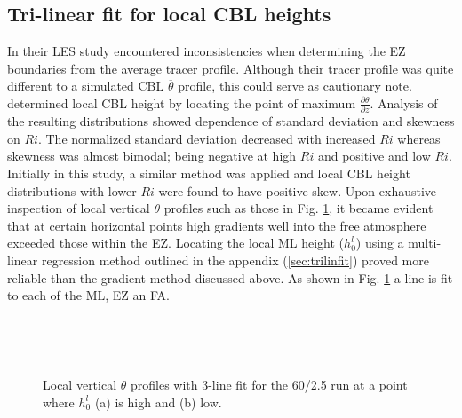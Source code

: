 \subsection{Tri-linear fit for local CBL heights}
In their LES study \cite{BrooksFowler2} encountered inconsistencies when determining the EZ boundaries from the average tracer profile.  Although their tracer profile was quite different to a simulated CBL $\overline{\theta}$ profile, this could serve as cautionary note.  \cite{SullMoengStev} determined local CBL height by locating the point of maximum $\frac{\partial \theta}{\partial z}$.  Analysis of the resulting distributions showed dependence of standard deviation and skewness on $Ri$.  The normalized standard deviation decreased with increased $Ri$ whereas skewness was almost bimodal; being negative at high $Ri$ and positive and low $Ri$.  Initially in this study, a similar method was applied and local CBL height distributions with lower $Ri$ were found to have positive skew.  Upon exhaustive inspection of local vertical $\theta$  profiles such as those in Fig. \ref{fig:rssfitshigh}, it became evident that at certain horizontal points high gradients well into the free atmosphere exceeded those within the EZ.  Locating the local ML height ($h^{l}_{0}$) using a multi-linear regression method outlined in the appendix (\ref{sec:trilinfit}) proved more reliable than the gradient method discussed above.  As shown in Fig. \ref{fig:rssfitshigh} a line is fit to each of the ML, EZ an FA.\\
  
\begin{figure}[htbp]
\begin{minipage}[b]{0.5\linewidth}
        \\
        \end{minipage}             
\quad
\begin{minipage}[b]{0.5\linewidth}
        \\
       
       \end{minipage}
\caption[High local ML ]{Local vertical $\theta$ profiles with 3-line fit for the 60/2.5 run at a point where $h^{l}_{0}$ (a) is high and (b) low.}
        
        \label{fig:rssfitshigh}
\end{figure}

